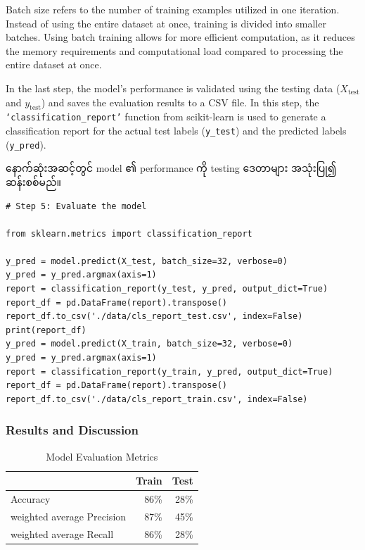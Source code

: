 \begin{remark}
Batch size refers to the number of training examples utilized in one iteration. Instead of using the entire dataset at once, training is divided into smaller batches. Using batch training allows for more efficient computation, as it reduces the memory requirements and computational load compared to processing the entire dataset at once.
\end{remark}


\begin{step}
In the last step, the model's performance is validated using the testing data (\(X_{\text{test}}\) and \(y_{\text{test}}\)) and saves the evaluation results to a CSV file. In this step, the \texttt{`classification\_report'} function from scikit-learn is used to generate a classification report for the actual test labels (\texttt{y\_test}) and the predicted labels (\texttt{y\_pred}).

နောက်ဆုံးအဆင့်တွင် model ၏ performance ကို testing ဒေတာများ အသုံးပြု၍ ဆန်းစစ်မည်။ 

\begin{lstlisting}
# Step 5: Evaluate the model

from sklearn.metrics import classification_report

y_pred = model.predict(X_test, batch_size=32, verbose=0)
y_pred = y_pred.argmax(axis=1)
report = classification_report(y_test, y_pred, output_dict=True)
report_df = pd.DataFrame(report).transpose()
report_df.to_csv('./data/cls_report_test.csv', index=False)
print(report_df)
y_pred = model.predict(X_train, batch_size=32, verbose=0)
y_pred = y_pred.argmax(axis=1)
report = classification_report(y_train, y_pred, output_dict=True)
report_df = pd.DataFrame(report).transpose()
report_df.to_csv('./data/cls_report_train.csv', index=False)

\end{lstlisting}
\end{step}

\subsubsection{Results and Discussion}
\begin{table}[htbp]
    \centering
    \caption{Model Evaluation Metrics}
    \label{tab:P2results}
    \begin{tabular}{l|r|r}
    \hline
    & \textbf{Train} & \textbf{Test} \\
    \hline
    Accuracy                            & 86\% & 28\% \\
    weighted average Precision & 87\% & 45\% \\
    weighted average Recall      & 86\% & 28\%\\
    \hline
    \end{tabular}
\end{table}

